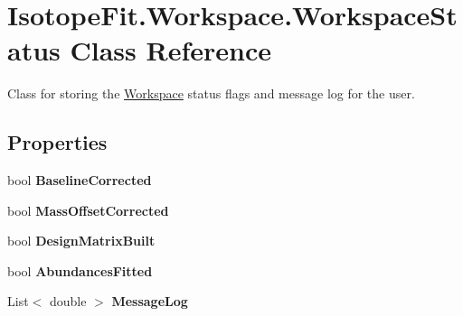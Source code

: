 \hypertarget{class_isotope_fit_1_1_workspace_1_1_workspace_status}{}\section{Isotope\+Fit.\+Workspace.\+Workspace\+Status Class Reference}
\label{class_isotope_fit_1_1_workspace_1_1_workspace_status}


Class for storing the \mbox{\hyperlink{class_isotope_fit_1_1_workspace}{Workspace}} status flags and message log for the user.  


\subsection*{Properties}
\begin{DoxyCompactItemize}
\item 
\mbox{\label{class_isotope_fit_1_1_workspace_1_1_workspace_status_a65fb659d552aa2c15400d40e09396229}} 
bool {\bfseries Baseline\+Corrected}
\item 
\mbox{\label{class_isotope_fit_1_1_workspace_1_1_workspace_status_a2f66d7e59cd164d2275e33ec3569eb5a}} 
bool {\bfseries Mass\+Offset\+Corrected}
\item 
\mbox{\label{class_isotope_fit_1_1_workspace_1_1_workspace_status_afa27a586f87d2d550fe9f45f0775a0f7}} 
bool {\bfseries Design\+Matrix\+Built}
\item 
\mbox{\label{class_isotope_fit_1_1_workspace_1_1_workspace_status_a15a3a16c34a8f8df6cdb7bcbc9118e53}} 
bool {\bfseries Abundances\+Fitted}
\item 
\mbox{\label{class_isotope_fit_1_1_workspace_1_1_workspace_status_aa1e34a4e9627d00e654a47aa13d44629}} 
List$<$ double $>$ {\bfseries Message\+Log}
\end{DoxyCompactItemize}



